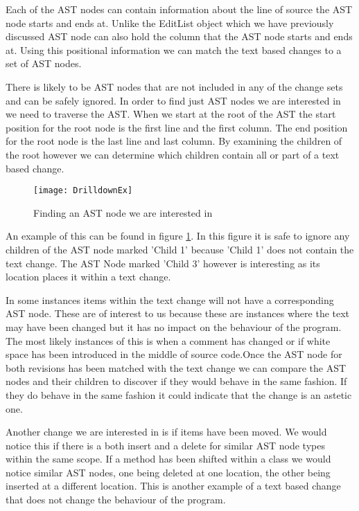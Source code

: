 Each of the AST nodes can contain information about the line of source the AST node starts and ends at.  Unlike the EditList object which we have previously discussed AST node can also hold the column that the AST node starts and ends at.  Using this positional information we can match the text based changes to a set of AST nodes.

There is likely to be AST nodes that are not included in any of the change sets and can be safely ignored. In order to find just AST nodes we are interested in we need to traverse the AST.  When we start at the root of the AST the start position for the root node is the first line and the first column. The end position for the root node is the last line and last column.  By examining the children of the root however we can determine which children contain all or part of a text based change.

\begin{figure}[h]
 \begin{center}
  \texttt{[image: DrilldownEx]}
 \end{center}
 \caption{Finding an AST node we are interested in}
 \label{fig:findingASTNode}
\end{figure}  

An example of this can be found in figure \ref{fig:findingASTNode}.  In this figure it is safe to ignore any children of the AST node marked 'Child 1' because 'Child 1' does not contain the text change.  The AST Node marked 'Child 3' however is interesting as its location places it within a text change. 

In some instances items within the text change will not have a corresponding AST node.  These are of interest to us because these are instances where the text may have been changed but it has no impact on the behaviour of the program.  The most likely instances of this is when a comment has changed or if white space has been introduced in the middle of source code.Once the AST node for both revisions has been matched with the text change we can compare the AST nodes and their children to discover if they would behave in the same fashion. If they do behave in the same fashion it could indicate that the change is an astetic one.   

Another change we are interested in is if items have been moved.  We would notice this if there is a both insert and a delete for similar AST node types within the same scope.  If a method has been shifted within a class we would notice similar AST nodes, one being deleted at one location, the other being inserted at a different location.  This is another example of a text based change that does not change the behaviour of the program.

